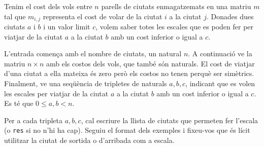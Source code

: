 

\Statement

Tenim el cost dels vols entre $n$ parells de ciutats enmagatzemats en una
matriu $m$ tal que $m_{i,j}$ representa el cost de volar de la ciutat $i$ a la
ciutat $j$. Donades dues ciutats $a$ i $b$ i  un valor limit $c$, volem saber
totes les escales que es poden fer per viatjar de la ciutat $a$ a la ciutat
$b$ amb un cost inferior o igual a $c$.

\Input

L'entrada comença amb el nombre de ciutats, un natural $n$.
A continuació ve la matriu $n\times n$ amb els costos dels vols,
que també són naturals. El cost de viatjar d'una ciutat a ella mateixa és zero
però els costos no tenen perquè ser simètrics.
Finalment, ve una seqüència de tripletes de naturals $a,b,c$, indicant
que es volen les escales per viatjar de la ciutat $a$ a la ciutat
$b$ amb un cost inferior o igual a $c$. Es té que $0\le a,b<n$.

\Output

Per a cada tripleta $a,b,c$, cal escriure la llista de ciutats que permeten fer l'escala
(o \texttt{res} si no n'hi ha cap). Seguiu el format dels exemples i fixeu-vos que és lícit
utilitzar la ciutat de sortida o d'arribada com a escala.

\SampleTwoCol


